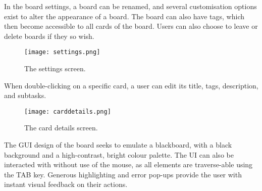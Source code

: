 In the board settings, a board can be renamed, and several customisation options exist to alter the appearance of a board. The board can also have tags, which then become accessible to all cards of the board. Users can also choose to leave or delete boards if they so wish.

\begin{figure}[ht]
    \texttt{[image: settings.png]}
    \caption{The settings screen.}
\end{figure}

When double-clicking on a specific card, a user can edit its title, tags, description, and subtasks.

\begin{figure}[ht]
    \texttt{[image: carddetails.png]}
    \caption{The card details screen.}
\end{figure}

The GUI design of the board seeks to emulate a blackboard, with a black background and a high-contrast, bright colour palette. The UI can also be interacted with without use of the mouse, as all elements are traverse-able using the TAB key. Generous highlighting and error pop-ups provide the user with instant visual feedback on their actions. 
